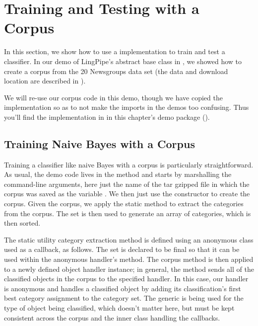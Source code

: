 \section{Training and Testing with a Corpus}

In this section, we show how to use a  implementation to
train and test a classifier.  In our demo of LingPipe's 
abstract base class in , we showed
how to create a corpus from the 20 Newsgroups data set (the data
and download location are described in ).

We will re-use our corpus code in this demo, though we have copied the
implementation so as to not make the imports in the demos too
confusing.  Thus you'll find the implementation in
 in this chapter's demo package
().

\subsection{Training Naive Bayes with a Corpus}

Training a classifier like naive Bayes with a corpus is particularly
straightforward.  As usual, the demo code lives in the 
method and starts by marshalling the command-line arguments, here just
the name of the tar gzipped file in which the corpus was saved as
the  variable .  We
then just use the constructor to create the corpus. 
%
%
Given the corpus, we apply the static method  to
extract the categories from the corpus.  The set is then used to generate
an array of categories, which is then sorted.

The static utility category extraction method is defined using an
anonymous class used as a callback, as follows.
%
%
The set is declared to be final so that it can be used within the
anonymous handler's method.  The corpus method  is
then applied to a newly defined object handler instance; in general,
the  method sends all of the classified objects in
the corpus to the specified handler.  In this case, our handler is
anonymous and handles a classified object by adding its
classification's first best category assignment to the category set.
The generic  is being used for the type of object being
classified, which doesn't matter here, but must be kept consistent
across the corpus and the inner class handling the callbacks.

